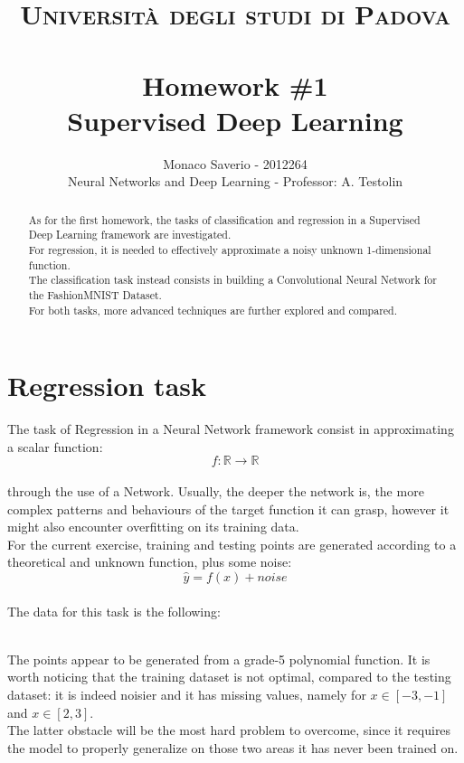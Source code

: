 \documentclass[11pt,a4paper,twocolumn]{IEEEtran}
\author{Monaco Saverio - 2012264 \sepline \\Neural Networks and Deep Learning - Professor: A. Testolin}
\title{{\normalsize\textsc{Università degli studi di Padova}}\vspace{-.5cm} \\ \sepline\\ \textbf{Homework \#1
\\ Supervised Deep Learning}}
\begin{document}
	\maketitle
	\begin{abstract} As for the first homework, the tasks of classification and regression in a Supervised Deep Learning framework are investigated.\\ For regression, it is needed to effectively approximate a noisy unknown 1-dimensional function.\\ The classification task instead consists in building a Convolutional Neural Network for the FashionMNIST Dataset.\\
	For both tasks, more advanced techniques are further explored and compared.
	\end{abstract}
			\section{\textbf{Regression task}}
			The task of Regression in a Neural Network framework consist in approximating a scalar function:\vspace*{-.3cm}
			$$f:\mathbb{R}\to\mathbb{R}$$\vspace*{-.5cm}\\
			through the use of a Network. Usually, the deeper the network is, the more complex patterns and behaviours of the target function it can grasp, however it might also encounter overfitting on its training data.\\
			 For the current exercise, training and testing points are generated according to a theoretical and unknown function, plus some noise:\vspace*{-.1cm}
			$$\hat{y}=f(x) + noise$$\vspace*{-1cm}\\
			
			The data for this task is the following:\vspace*{-.5cm}
			\begin{figure}[h]
				\centering
				
			\end{figure}\\
			The points appear to be generated from a grade-5 polynomial function. It is worth noticing that the training dataset is not optimal, compared to the testing dataset: it is indeed noisier and it has missing values, namely for $x\in[-3,-1]$ and $x\in[2,3]$.\\
			The latter obstacle will be the most hard problem to overcome, since it requires the model to properly generalize on those two areas it has never been trained on.
\end{document}
